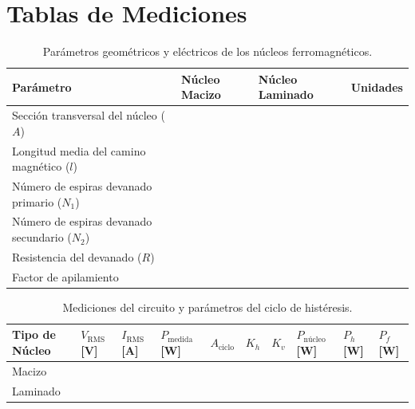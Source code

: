 \section{Tablas de Mediciones}

\begin{table}[H]
\centering
\begin{tabularx}{\textwidth}{|X|Y|Y|Y|}
\hline
\textbf{Parámetro} & \textbf{Núcleo Macizo} & \textbf{Núcleo Laminado} & \textbf{Unidades} \\ \hline
Sección transversal del núcleo ($A$) & & & \\ \hline
Longitud media del camino magnético ($l$) & & & \\ \hline
Número de espiras devanado primario ($N_1$) & & & \\ \hline
Número de espiras devanado secundario ($N_2$) & & & \\ \hline
Resistencia del devanado ($R$) & & & \\ \hline
Factor de apilamiento & & & \\ \hline
\end{tabularx}
\caption{Parámetros geométricos y eléctricos de los núcleos ferromagnéticos.}
\label{tab:parametros}
\end{table}

\begin{table}[H]
\centering
\scriptsize
\begin{tabularx}{\textwidth}{| >{\hsize}Y | >{\hsize}Y | >{\hsize}Y | >{\hsize}Y | >{\hsize}Y | >{\hsize}Y | >{\hsize}Y | >{\hsize}Y | >{\hsize}Y | >{\hsize}Y |}
\hline
\textbf{Tipo de Núcleo} & \textbf{$V_{\text{RMS}}$ [V]} & \textbf{$I_{\text{RMS}}$ [A]} & \textbf{$P_{\text{medida}}$ [W]} & \textbf{$A_{\text{ciclo}}$} & \textbf{$K_h$} & \textbf{$K_v$} & \textbf{$P_{\text{núcleo}}$ [W]} & \textbf{$P_h$ [W]} & \textbf{$P_f$ [W]} \\ \hline
Macizo & & & & & & & & & \\ \hline
Laminado & & & & & & & & & \\ \hline
\end{tabularx}
\caption{Mediciones del circuito y parámetros del ciclo de histéresis.}
\label{tab:mediciones}
\end{table}


